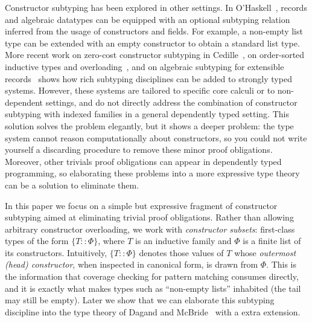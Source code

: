 \documentclass[a4paper, anonymous, UKenglish,cleveref, autoref, thm-restate]{lipics-v2021}
\begin{document}
Constructor subtyping has been explored in other settings. In O'Haskell~\cite{Nordlander987777}, records and algebraic datatypes can be equipped with an optional subtyping relation inferred from the usage of constructors and fields. For example, a non-empty list type can be extended with an empty constructor to obtain a standard list type. More recent work on zero-cost constructor subtyping in Cedille~\cite{MarmadukeJenkinsStump,jenkins2019elaborating}, on order-sorted inductive types and overloading~\cite{BatheGillesFradeMaria,barthe}, and on algebraic subtyping for extensible records~\cite{MarquesFloridoVasconcelos2024} shows how rich subtyping disciplines can be added to strongly typed systems. However, these systems are tailored to specific core calculi or to non-dependent settings, and do not directly address the combination of constructor subtyping with indexed families in a general dependently typed setting.
This solution solves the problem elegantly, but it shows a deeper problem: the type system cannot reason computationally about constructors, so you could not write yourself a discarding procedure to remove these minor proof obligations.
Moreover, other trivials proof obligations can appear in dependently typed programming, so elaborating these problems into a more expressive type theory can be a solution to eliminate them.

In this paper we focus on a simple but expressive fragment of constructor subtyping aimed at eliminating trivial proof obligations. Rather than allowing arbitrary constructor overloading, we work with \emph{constructor subsets}: first-class types of the form $\{T :: \Phi\}$, where $T$ is an inductive family and $\Phi$ is a finite list of its constructors. Intuitively, $\{T :: \Phi\}$ denotes those values of $T$ whose \emph{outermost (head) constructor}, when inspected in canonical form, is drawn from $\Phi$. This is the information that coverage checking for pattern matching consumes directly, and it is exactly what makes types such as ``non-empty lists'' inhabited (the tail may still be empty). 
Later we show that we can elaborate this subtyping discipline into the type theory of Dagand and McBride~\cite{dagand2012elaborating} with a extra extension. 
\end{document}
